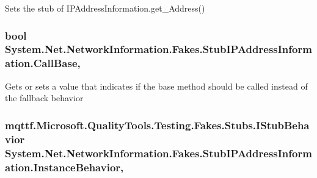 Sets the stub of I\-P\-Address\-Information.\-get\-\_\-\-Address()

\hypertarget{class_system_1_1_net_1_1_network_information_1_1_fakes_1_1_stub_i_p_address_information_a994ea259ca8fdc3e50374e3257284039}{
\subsubsection[{Call\-Base}]{\setlength{\rightskip}{0pt plus 5cm}bool System.\-Net.\-Network\-Information.\-Fakes.\-Stub\-I\-P\-Address\-Information.\-Call\-Base\hspace{0.3cm}{\ttfamily [get]}, {\ttfamily [set]}}}\label{class_system_1_1_net_1_1_network_information_1_1_fakes_1_1_stub_i_p_address_information_a994ea259ca8fdc3e50374e3257284039}


Gets or sets a value that indicates if the base method should be called instead of the fallback behavior

\hypertarget{class_system_1_1_net_1_1_network_information_1_1_fakes_1_1_stub_i_p_address_information_acb2f665461cbb3313e3f340755e47e10}{
\subsubsection[{Instance\-Behavior}]{\setlength{\rightskip}{0pt plus 5cm}mqttf.\-Microsoft.\-Quality\-Tools.\-Testing.\-Fakes.\-Stubs.\-I\-Stub\-Behavior System.\-Net.\-Network\-Information.\-Fakes.\-Stub\-I\-P\-Address\-Information.\-Instance\-Behavior\hspace{0.3cm}{\ttfamily [get]}, {\ttfamily [set]}}}\label{class_system_1_1_net_1_1_network_information_1_1_fakes_1_1_stub_i_p_address_information_acb2f665461cbb3313e3f340755e47e10}


